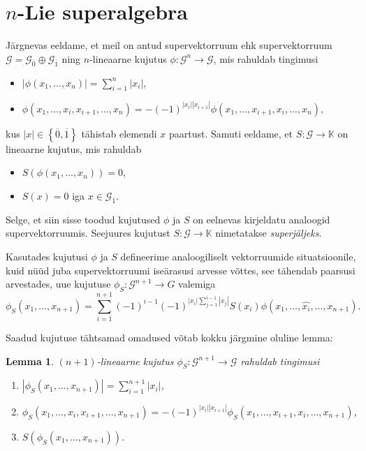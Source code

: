 \documentclass[12pt,a4paper]{article}
\theoremstyle{plain}
\newtheorem{lemma}[thm]{Lemma}
\theoremstyle{definition}
\newcommand{\K}{\mathbb{K}}
\newcommand{\G}{\mathcal{G}}
\newcommand{\col}{\colon}
\newcommand{\arr}{\rightarrow}
\begin{document}

\section{\texorpdfstring{$n$}\ -Lie superalgebra}

Järgnevas eeldame, et meil on antud supervektorruum
ehk supervektorruum $\G = \G_{\overline{0}} \oplus \G_{\overline{1}}$
ning $n$-lineaarne kujutus $\phi \col \G^n \arr \G$, mis rahuldab
tingimusi
\begin{itemize}
    \item $| \phi(x_1, \dots, x_n) | = \sum_{i=1}^n |x_i|$,
    \item $ \phi \left( x_1, \dots, x_i, x_{i+1}, \dots, x_n \right) =
            -(-1)^{ |x_i| |x_{i+1}| } \phi \left(
                x_1, \dots, x_{i+1}, x_i, \dots, x_n \right), $
\end{itemize}
kus $|x| \in \left\{ \overline{0}, \overline{1} \right\}$
tähistab elemendi $x$ paartust. Samuti eeldame, et $S \col \G \arr \K$
on lineaarne kujutus, mis rahuldab
\begin{itemize}
    \item $S \left( \phi \left( x_1, \dots, x_n \right) \right) = 0$,
    \item $S(x) = 0$ iga $x \in \G_{\overline{1}}$.
\end{itemize}

Selge, et siin sisse toodud kujutused $\phi$ ja $S$ on eelnevas
kirjeldatu analoogid supervektorruumis. Seejuures kujutust $S \col \G \arr \K$
nimetatakse \emph{superjäljeks}.

Kasutades kujutusi $\phi$ ja $S$ defineerime analoogiliselt
vektorruumide situatsioonile, kuid nüüd juba supervektorruumi iseärasusi
arvesse võttes, see tähendab paarsusi arvestades, uue kujutuse
$\phi_S \col \G^{n+1} \arr G$ valemiga
\[
    \phi_S (x_1, \dots, x_{n+1}) =
    \sum_{i=1}^{n+1} (-1)^{i-1}(-1)^{|x_i| \sum_{j=1}^{i-1} |x_j| }
        S(x_i) \phi \left(
            x_1, \dots, \hat{x_i}, \dots, x_{n+1}
        \right).
\]

Saadud kujutuse tähtsamad omadused võtab kokku järgmine oluline lemma:

\begin{lemma}
    $(n+1)$-lineaarne kujutus $\phi_S \col \G^{n+1} \arr \G$
    rahuldab tingimusi
    \begin{enumerate}
        \item $ | \phi_S \left(x_1, \dots, x_{n+1} \right) | =
               \sum_{i=1}^{n+1} |x_i| $,
        \item $ \phi_S \left(x_1, \dots, x_i, x_{i+1}, \dots, x_{n+1} \right) =
               -(-1)^{|x_i| |x_{i+1}|} \phi_S \left(
                    x_1, \dots, x_{i+1}, x_i, \dots, x_{n+1}
                \right) $,
        \item $S \left( \phi_S \left( x_1, \dots, x_{n+1} \right) \right)$.
    \end{enumerate}
\end{lemma}
\end{document}
